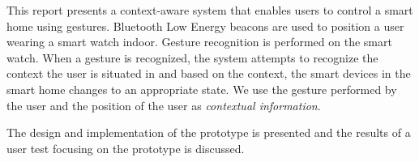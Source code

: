 This report presents a context-aware system that enables users to control a smart home using gestures. Bluetooth Low Energy beacons are used to position a user wearing a smart watch indoor. Gesture recognition is performed on the smart watch. When a gesture is recognized, the system attempts to recognize the context the user is situated in and based on the context, the smart devices in the smart home changes to an appropriate state. We use the gesture performed by the user and the position of the user as \emph{contextual information}.

The design and implementation of the prototype is presented and the results of a user test focusing on the prototype is discussed.
